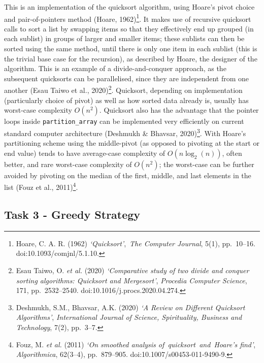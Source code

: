 \documentclass[
]{article}
\begin{document}
This is an implementation of the quicksort algorithm, using Hoare's
pivot choice and pair-of-pointers method (Hoare, 1962)\footnote{Hoare,
  C. A. R. (1962) \emph{`Quicksort'},~\emph{The Computer Journal}, 5(1),
  pp.~10--16. doi:10.1093/comjnl/5.1.10.}. It makes use of recursive
quicksort calls to sort a list by swapping items so that they
effectively end up grouped (in each sublist) in groups of larger and
smaller items; these sublists can then be sorted using the same method,
until there is only one item in each sublist (this is the trivial base
case for the recursion), as described by Hoare, the designer of the
algorithm. This is an example of a divide-and-conquer approach, as the
subsequent quicksorts can be parallelised, since they are independent
from one another (Esau Taiwo et al., 2020)\footnote{Esau Taiwo, O.
  \emph{et al.} (2020) \emph{`Comparative study of two divide and
  conquer sorting algorithms: Quicksort and Mergesort'}, \emph{Procedia
  Computer Science}, 171, pp.~2532--2540.
  doi:10.1016/j.procs.2020.04.274.}. Quicksort, depending on
implementation (particularly choice of pivot) as well as how sorted data
already is, usually has worst-case complexity \(O(n^2)\). Quicksort also
has the advantage that the pointer loops inside
\texttt{partition\_array} can be implemented very efficiently on current
standard computer architecture (Deshmukh \& Bhavsar, 2020)\footnote{Deshmukh,
  S.M., Bhavsar, A.K. (2020) \emph{`A Review on Different Quicksort
  Algorithms'}, \emph{International Journal of Science, Spirituality,
  Business and Technology}, 7(2), pp.~3--7.}. With Hoare's partitioning
scheme using the middle-pivot (as opposed to pivoting at the start or
end value) tends to have average-case complexity of \(O(n \log_2(n))\),
often better, and rare worst-case complexity of \(O(n^2)\); the
worst-case can be further avoided by pivoting on the median of the
first, middle, and last elements in the list (Fouz et al.,
2011)\footnote{Fouz, M. \emph{et al.} (2011) \emph{`On smoothed analysis
  of~quicksort~and~Hoare's find'}, \emph{Algorithmica}, 62(3--4),
  pp.~879--905. doi:10.1007/s00453-011-9490-9.}.

\newpage

\subsection{Task 3 - Greedy Strategy}\label{task-3---greedy-strategy}
\end{document}
